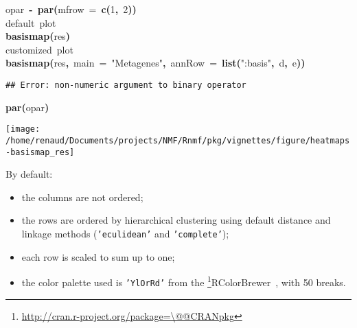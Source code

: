 \documentclass[a4paper]{article}\usepackage{graphicx, color}
\makeatletter
\def\maxwidth{ %
  \ifdim\Gin@nat@width>\linewidth
    \linewidth
  \else
    \Gin@nat@width
  \fi
}
\newcommand{\hlnumber}[1]{\textcolor[rgb]{0,0,0}{#1}}%
\newcommand{\hlfunctioncall}[1]{\textcolor[rgb]{0.501960784313725,0,0.329411764705882}{\textbf{#1}}}%
\newcommand{\hlstring}[1]{\textcolor[rgb]{0.6,0.6,1}{#1}}%
\newcommand{\hlkeyword}[1]{\textcolor[rgb]{0,0,0}{\textbf{#1}}}%
\newcommand{\hlargument}[1]{\textcolor[rgb]{0.690196078431373,0.250980392156863,0.0196078431372549}{#1}}%
\newcommand{\hlcomment}[1]{\textcolor[rgb]{0.180392156862745,0.6,0.341176470588235}{#1}}%
\newcommand{\hlassignement}[1]{\textcolor[rgb]{0,0,0}{\textbf{#1}}}%
\newcommand{\hlsymbol}[1]{\textcolor[rgb]{0,0,0}{#1}}%
\newcommand{\hlstd}[1]{\textcolor[rgb]{0,0,0}{#1}}%
\newenvironment{kframe}{%
 \def\FrameCommand##1{\hskip\@totalleftmargin \hskip-\fboxsep
 \colorbox{shadecolor}{##1}\hskip-\fboxsep
     \hskip-\linewidth \hskip-\@totalleftmargin \hskip\columnwidth}%
 \MakeFramed {\advance\hsize-\width
   \@totalleftmargin\z@ \linewidth\hsize
   \@setminipage}}%
 {\par\unskip\endMakeFramed}
\newenvironment{knitrout}{}{} %
\let\code=\texttt
\newcommand{\pkgname}[1]{\textit{#1}\xspace}
\newcommand{\CRANurl}[1]{\url{http://cran.r-project.org/package=#1}}
\def\CRANpkg{\@ifstar\@CRANpkg\@@CRANpkg}
\def\@CRANpkg#1{\href{http://cran.r-project.org/package=#1}{\pkgname{#1}}\footnote{\CRANurl{#1}}}
\def\@@CRANpkg#1{\href{http://cran.r-project.org/package=#1}{\pkgname{#1}} package\footnote{\CRANurl{#1}}}
\newcommand{\citeCRANpkg}[1]{\CRANpkg{#1}~\cite{#1}}
\makeatother
\begin{document}
\begin{knitrout}
\color{fgcolor}\begin{kframe}
\begin{flushleft}
\ttfamily\noindent
\hlsymbol{opar}{\ }\hlassignement{\usebox{\hlnormalsizeboxlessthan}-}{\ }\hlfunctioncall{par}\hlkeyword{(}\hlargument{mfrow}{\ }\hlargument{=}{\ }\hlfunctioncall{c}\hlkeyword{(}\hlnumber{1}\hlkeyword{,}{\ }\hlnumber{2}\hlkeyword{)}\hlkeyword{)}\hspace*{\fill}\\
\hlstd{}\hlcomment{\usebox{\hlnormalsizeboxhash}{\ }default{\ }plot}\hspace*{\fill}\\
\hlstd{}\hlfunctioncall{basismap}\hlkeyword{(}\hlsymbol{res}\hlkeyword{)}\hspace*{\fill}\\
\hlstd{}\hlcomment{\usebox{\hlnormalsizeboxhash}{\ }customized{\ }plot}\hspace*{\fill}\\
\hlstd{}\hlfunctioncall{basismap}\hlkeyword{(}\hlsymbol{res}\hlkeyword{,}{\ }\hlargument{main}{\ }\hlargument{=}{\ }\hlstring{"{}Metagenes"{}}\hlkeyword{,}{\ }\hlargument{annRow}{\ }\hlargument{=}{\ }\hlfunctioncall{list}\hlkeyword{(}\hlstring{"{}:basis"{}}\hlkeyword{,}{\ }\hlsymbol{d}\hlkeyword{,}{\ }\hlsymbol{e}\hlkeyword{)}\hlkeyword{)}\mbox{}
\normalfont
\end{flushleft}
\begin{verbatim}
## Error: non-numeric argument to binary operator
\end{verbatim}
\begin{flushleft}
\ttfamily\noindent
\hlfunctioncall{par}\hlkeyword{(}\hlsymbol{opar}\hlkeyword{)}\mbox{}
\normalfont
\end{flushleft}
\end{kframe}\texttt{[image: /home/renaud/Documents/projects/NMF/Rnmf/pkg/vignettes/figure/heatmaps-basismap\_res]} 
\end{knitrout}


By default:
\begin{itemize}
\item the columns are not ordered;
\item the rows are ordered by hierarchical clustering using default distance and 
linkage methods (\code{'eculidean'} and \code{'complete'});
\item each row is scaled to sum up to one;
\item the color palette used is \code{'YlOrRd'} from the
\citeCRANpkg{RColorBrewer}, with 50 breaks.
\end{itemize}
\end{document}
